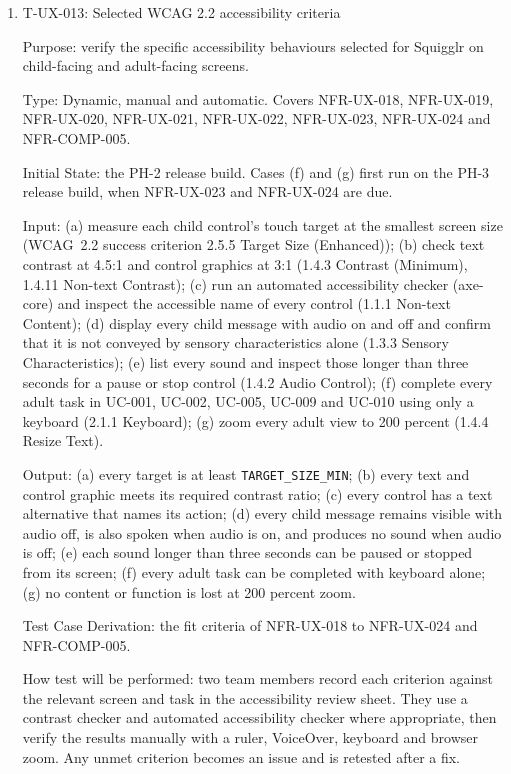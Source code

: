 \documentclass[12pt, titlepage]{article}
\newcommand{\testitem}[1]{\item #1\par\nopagebreak}
\begin{document}
\begin{enumerate}
How test will be performed: the team records each glossary term and when
and whether it is explained, then searches the text of each view for the listed
diagnostic words. The participants take the survey 
after the review.

\testitem{T-UX-013: Selected WCAG 2.2 accessibility criteria}

Purpose: verify the specific accessibility behaviours selected for Squigglr
on child-facing and adult-facing screens.

Type: Dynamic, manual and automatic. Covers NFR-UX-018, NFR-UX-019, NFR-UX-020, 
NFR-UX-021, NFR-UX-022, NFR-UX-023, NFR-UX-024 and NFR-COMP-005.

Initial State: the PH-2 release build. Cases (f) and (g) first run on the PH-3
release build, when NFR-UX-023 and NFR-UX-024 are due.

Input: (a) measure each child control's touch target at the smallest screen
size (WCAG~2.2 success criterion 2.5.5 Target Size (Enhanced)); (b) check
text contrast at 4.5:1 and control graphics at 3:1 (1.4.3 Contrast
(Minimum), 1.4.11 Non-text Contrast); (c) run an automated accessibility
checker (axe-core) and inspect the accessible name of every control (1.1.1 Non-text
Content); (d) display every child message with audio on and off and confirm
that it is not conveyed by sensory characteristics alone (1.3.3 Sensory
Characteristics); (e) list every sound and inspect those longer than three
seconds for a pause or stop control (1.4.2 Audio Control); (f) complete every adult task
in UC-001, UC-002, UC-005, UC-009 and UC-010 using only a keyboard
(2.1.1 Keyboard); (g) zoom every adult view to 200 percent (1.4.4 Resize
Text).

Output: (a) every target is at least \texttt{TARGET\_SIZE\_MIN}; (b) every
text and control graphic meets its required contrast ratio; (c) every
control has a text alternative that names its action; (d) every child
message remains visible with audio off, is also spoken when audio is on,
and produces no sound when audio is off;
(e) each sound longer than three seconds can be paused or stopped from its
screen; (f) every adult task can be completed with keyboard alone; (g) no
content or function is lost at 200 percent zoom.

Test Case Derivation: the fit criteria of NFR-UX-018 to NFR-UX-024 and 
NFR-COMP-005.

How test will be performed: two team members record each criterion against
the relevant screen and task in the accessibility review sheet. They use a
contrast checker and automated accessibility checker where appropriate,
then verify the results manually with a ruler, VoiceOver, keyboard and
browser zoom. Any unmet criterion becomes an issue and is retested after a
fix.

\end{enumerate}
\end{document}

